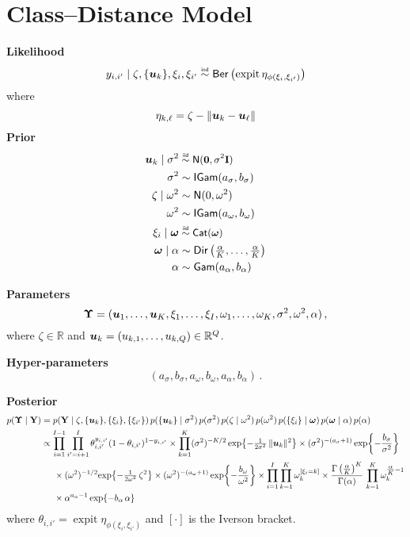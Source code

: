 \documentclass[letterpaper,12pt,openany]{article}
\def\exp#1{{\rm exp}{#1}}
\def\frac#1#2{{{#1}\over{#2}}}
\DeclareMathOperator*{\expit}{expit}
\newcommand\simiid{\mathrel{\overset{\makebox[0pt]{\mbox{\normalfont\tiny\sffamily iid}}}{\sim}}}
\newcommand\simind{\mathrel{\overset{\makebox[0pt]{\mbox{\normalfont\tiny\sffamily ind}}}{\sim}}}
\newcommand{\ex}[1]{\exp{ \left\{ #1 \right\}}}
\def\Cat{\small{\mathsf{Cat}}}
\def\Dir{\small{\mathsf{Dir}}}
\def\Ber{\small{\mathsf{Ber}}}
\def\Nor{\small{\mathsf{N}}}
\def\Gamd{\small{\mathsf{Gam}}}
\def\IGamd{\small{\mathsf{IGam}}}
\def\I{\mathbf{I}}\def\i{\mathbf{i}}\def\Iv{\boldsymbol{I}}\def\iv{\boldsymbol{i}}
\def\Y{\mathbf{Y}}\def\y{\mathbf{y}}\def\Yv{\boldsymbol{Y}}\def\yv{\boldsymbol{y}}
\def\al{\alpha}\def\alv{\boldsymbol{\alpha}}
\def\sig{\sigma}\def\sigv{\boldsymbol{\sigma}}
\def\ome{\omega}
\def\zerov{\boldsymbol{0}}
\def\reals{\mathbb{R}}
\begin{document}
\section{Class--Distance Model}

\textbf{Likelihood}
$$y_{i,i'}\mid \zeta, \{\uv_k \}, \xi_i,\xi_{i'} \simind \Ber\left( \expit\eta_{\phi(\xi_i,\xi_{i'})}  \right)$$
where
$$\eta_{k,\ell} = \zeta - \|\boldsymbol{u}_k - \boldsymbol{u}_\ell\|$$
\textbf{Prior}
\begin{align*}
\uv_{k}\mid\sigma^2 & \simiid \Nor(\zerov,\sig^2\I) \\
\sigma^2            & \sim    \IGamd(a_{\sig}, b_{\sig}) \\
\zeta\mid \ome^2    & \sim    \Nor(0,\ome^2)        \\
\ome^2              & \sim    \IGamd(a_{\ome}, b_{\ome}) \\
\xi_i\mid\omev &\simiid \Cat(\omev) \\
\omev\mid\al &\sim \Dir\left(\tfrac{\al}{K},\ldots,\tfrac{\al}{K}\right) \\
\al &\sim \Gamd(a_\al,b_\al)
\end{align*}

\textbf{Parameters}
$$\UPS=(\uv_1,\ldots,\uv_K, \xi_1,\ldots,\xi_I,\omega_1,\ldots,\omega_K, \sig^2, \ome^2, \alpha)\,,$$
where $\zeta\in\reals$ and $\uv_k=(u_{k,1},\ldots,u_{k,Q})\in\reals^Q$.

\textbf{Hyper-parameters} $$(a_{\sig}, b_{\sig}, a_{\ome}, b_{\ome}, a_\al, b_\al)\,.$$

\textbf{Posterior}
\begin{align*}
p(\UPS\mid\Y) &= p(\Y\mid \zeta, \{\uv_k \}, \{\xi_{i}\}, \{\xi_{i'}\})\,p(\{\uv_k\}\mid\sigma^2)\,p(\sigma^2)\,p(\zeta\mid\omega^2)\,p(\omega^2)\,p(\{\xi_i\}\mid\omev)\,p(\omev\mid\alpha)\,p(\alpha)\\
&\propto\prod_{i=1}^{I-1}\prod_{i'=i+1}^I \theta_{i,i'}^{y_{i,i'}}(1-\theta_{i,i'})^{1-y_{i,i'}} \times 
\prod_{k=1}^K (\sig^2)^{-K/2}\,\ex{-\tfrac{1}{2\sig^2}\,\|\uv_k\|^2} \times(\sig^2)^{-(a_\sig+1)}\,\ex{-\frac{b_\sig}{\sig^2}} \\
&\hspace{0.5cm} \times (\ome^2)^{-1/2} \ex{-\tfrac{1}{2\ome^2}\,\zeta^2} \times (\ome^2)^{-(a_\ome+1)}\,\ex{-\frac{b_\ome}{\ome^2}} 
\times \prod_{i=1}^I\prod_{k=1}^K\omega_k^{[\xi_i=k]} \times \frac{\Gamma\left(\tfrac{\al}{K}\right)^K}{\Gamma(\alpha)}\,\prod_{k=1}^K \ome_k^{\tfrac{\al}{K}-1} \\
&\hspace{0.5cm} \times \alpha^{a_\al-1}\,\ex{-b_\al\,\al}
\end{align*}
where $\theta_{i,i'}=\expit\eta_{\phi(\xi_i,\xi_{i'})}$ and $[\cdot]$ is the Iverson bracket.
\end{document}
